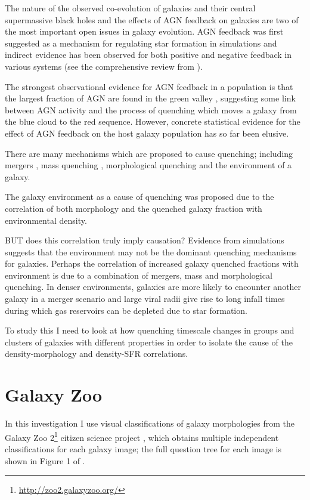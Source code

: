 The nature of the observed co-evolution of galaxies and their central supermassive black holes \citep{Mag98, MH03, HR04} and the effects of AGN feedback on galaxies are two of the most important open issues in galaxy evolution. AGN feedback was first suggested as a mechanism for regulating star formation in simulations \citep{SR98, Croton06, Bower06, Somer08} and indirect evidence has been observed for both positive and negative feedback in various systems (see the comprehensive review from \citealt{Fab06}). 

The strongest observational evidence for AGN feedback in a population is that the largest fraction of AGN are found in the green valley \citep{CB08, Hickox09, Sch2010}, suggesting some link between AGN activity and  the process of quenching which moves a galaxy from the blue cloud to the red sequence. However, concrete statistical evidence for the effect of AGN feedback on the host galaxy population has so far been elusive.

There are many mechanisms which are proposed to cause quenching; including mergers \citep{daddi10}, mass quenching \citep{kennicutt77, peng12}, morphological quenching \citep{faber12} and the environment of a galaxy.
 
 The galaxy environment as a cause of quenching was proposed due to the correlation of both morphology \citep{dressler80} and the quenched galaxy fraction \citep{?} with environmental density. 
 
 BUT does this correlation truly imply causation? Evidence from simulations \citep{?} suggests that the environment may not be the dominant quenching mechanisms for galaxies. Perhaps the correlation of increased galaxy quenched fractions with environment is due to a combination of mergers, mass and morphological quenching. In denser environments, galaxies are more likely to encounter another galaxy in a merger scenario and large viral radii give rise to long infall times during which gas reservoirs can be depleted due to star formation.
 
 To study this I need to look at how quenching timescale changes in groups and clusters of galaxies with different properties in order to isolate the cause of the density-morphology and density-SFR correlations. 

\section{Galaxy Zoo}

In this investigation I use visual classifications of galaxy morphologies from the Galaxy Zoo 2\footnote{\url{http://zoo2.galaxyzoo.org/}} citizen science project \citep{GZ2}, which obtains multiple independent classifications for each galaxy image; the full question tree for each image is shown in Figure 1 of \citealt{GZ2}.  

